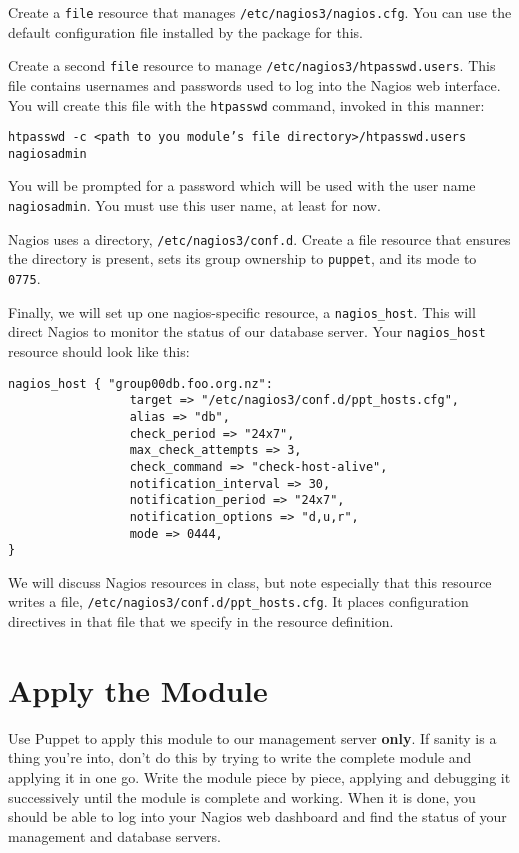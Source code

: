 \documentclass{article}   	%
\begin{document}
Create a \texttt{file} resource that manages \texttt{/etc/nagios3/nagios.cfg}. You can use the default configuration file installed by the package for this. 

Create a second \texttt{file} resource to manage \texttt{/etc/nagios3/htpasswd.users}. This file contains usernames and passwords used to log into the Nagios web interface. You will create this file with the \texttt{htpasswd} command, invoked in this manner:

\texttt{htpasswd -c <path to you module's file directory>/htpasswd.users nagiosadmin}

You will be prompted for a password which will be used with the user name \texttt{nagiosadmin}. You must use this user name, at least for now.

Nagios uses a directory, \texttt{/etc/nagios3/conf.d}. Create a file resource that ensures the directory is present, sets its group ownership to \texttt{puppet}, and its mode to \texttt{0775}.

Finally, we will set up one nagios-specific resource, a \texttt{nagios\_host}. This will direct Nagios to monitor the status of our database server. Your \texttt{nagios\_host} resource should look like this:

\begin{verbatim}
nagios_host { "group00db.foo.org.nz":
                 target => "/etc/nagios3/conf.d/ppt_hosts.cfg",
                 alias => "db",
                 check_period => "24x7",
                 max_check_attempts => 3,
                 check_command => "check-host-alive",
                 notification_interval => 30,
                 notification_period => "24x7",
                 notification_options => "d,u,r",
                 mode => 0444,
}

\end{verbatim}

We will discuss Nagios resources in class, but note especially that this resource writes a file, \texttt{/etc/nagios3/conf.d/ppt\_hosts.cfg}. It places configuration directives in that file that we specify in the resource definition.

\section{Apply the Module}

Use Puppet to apply this module to our management server \textbf{only}. If sanity is a thing you're into, don't do this by trying to write the complete module and applying it in one go. Write the module piece by piece, applying and debugging it successively until the module is complete and working. When it is done, you should be able to log into your Nagios web dashboard and find the status of your management and database servers. 
\end{document}
